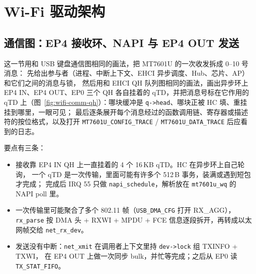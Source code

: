 \chapter{Wi-Fi 驱动架构}\label{ch:wifi-arch}
\begingroup
\renewcommand{\chapter}[1]{}

\endgroup



\clearpage
\section{通信图：EP4 接收环、NAPI 与 EP4 OUT 发送}\label{wa:comm}
这一节用和 USB 键盘通信图相同的画法，把 MT7601U 的一次收发拆成 0--10 号消息：
先给出参与者（进程、中断上下文、EHCI 异步调度、Hub、芯片、AP）和它们之间的消息与锁，
然后用和 EHCI QH 队列图相同的画法，画出异步环上 EP4 IN、EP4 OUT、EP0 三个 QH 各自挂着的 qTD，并把消息号标在它作用的 qTD 上（图~\ref{fig:wifi-comm-qh}）：哪块缓冲是 \texttt{q->head}、哪块正被 HC 填、重挂挂到哪里，一眼可见；
最后逐条展开每个消息经过的函数调用链、寄存器或描述符的按位格式，以及打开
\texttt{MT7601U\_CONFIG\_TRACE} / \texttt{MT7601U\_DATA\_TRACE} 后应看到的日志。

要点有三条：
\begin{itemize}
\item 接收靠 EP4 IN QH 上一直挂着的 4 个 16\,KB qTD。HC 在异步环上自己轮询，
      一个 qTD 是一次传输，里面可能有许多个 512\,B 事务，装满或遇到短包才完成；
      完成后 IRQ 55 只做 \texttt{napi\_schedule}，解析放在 \texttt{mt7601u\_wq} 的 NAPI poll 里。
\item 一次传输里可能聚合了多个 802.11 帧（\texttt{USB\_DMA\_CFG} 打开 RX\_AGG），
      \texttt{rx\_parse} 按 DMA 头 + RXWI + MPDU + FCE 信息逐段拆开，再转成以太网帧交给 \texttt{net\_rx\_dev}。
\item 发送没有中断：\texttt{net\_xmit} 在调用者上下文里持 \texttt{dev->lock} 组 TXINFO + TXWI，
      在 EP4 OUT 上做一次同步 bulk，并忙等完成；之后从 EP0 读 \texttt{TX\_STAT\_FIFO}。
\end{itemize}

